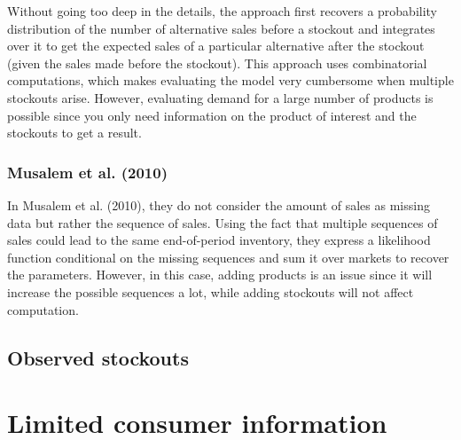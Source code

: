 Without going too deep in the details, the approach first recovers a probability distribution of the number of alternative sales before a stockout and integrates over it to get the expected sales of a particular alternative after the stockout (given the sales made before the stockout). This approach uses combinatorial computations, which makes evaluating the model very cumbersome when multiple stockouts arise. However, evaluating demand for a large number of products is possible since you only need information on the product of interest and the stockouts to get a result.

\subsubsection{Musalem et al. (2010)}

In Musalem et al. (2010), they do not consider the amount of sales as missing data but rather the sequence of sales. Using the fact that multiple sequences of sales could lead to the same end-of-period inventory, they express a likelihood function conditional on the missing sequences and sum it over markets to recover the parameters. However, in this case, adding products is an issue since it will increase the possible sequences a lot, while adding stockouts will not affect computation.

\subsection{Observed stockouts}



\section{Limited consumer information}

